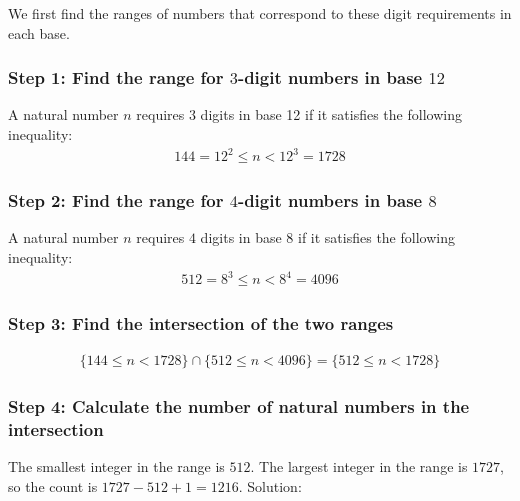 We first find the ranges of numbers that correspond to these digit requirements in each base.

\subsubsection*{Step 1: Find the range for $3$-digit numbers in base $12$}

A natural number $n$ requires $3$ digits in base 12 if it satisfies the following inequality:
\begin{align*}
144 = 12^{2} \le n < 12^{3} = 1728
\end{align*}

\subsubsection*{Step 2: Find the range for $4$-digit numbers in base $8$}

A natural number $n$ requires $4$ digits in base $8$ if it satisfies the following inequality:
\begin{align*}
512 = 8^{3} \le n < 8^{4} = 4096
\end{align*}

\subsubsection*{Step 3: Find the intersection of the two ranges}
\begin{align*}
\{ 144 \le n < 1728 \} 
\cap
\{ 512 \le n < 4096 \}
= 
\{ 512 \le n < 1728 \}
\end{align*}
\subsubsection*{Step 4: Calculate the number of natural numbers in the intersection}

The smallest integer in the range is $512$. The largest integer in the range is $1727$, so the count is $1727-512+1=1216$. Solution: 
